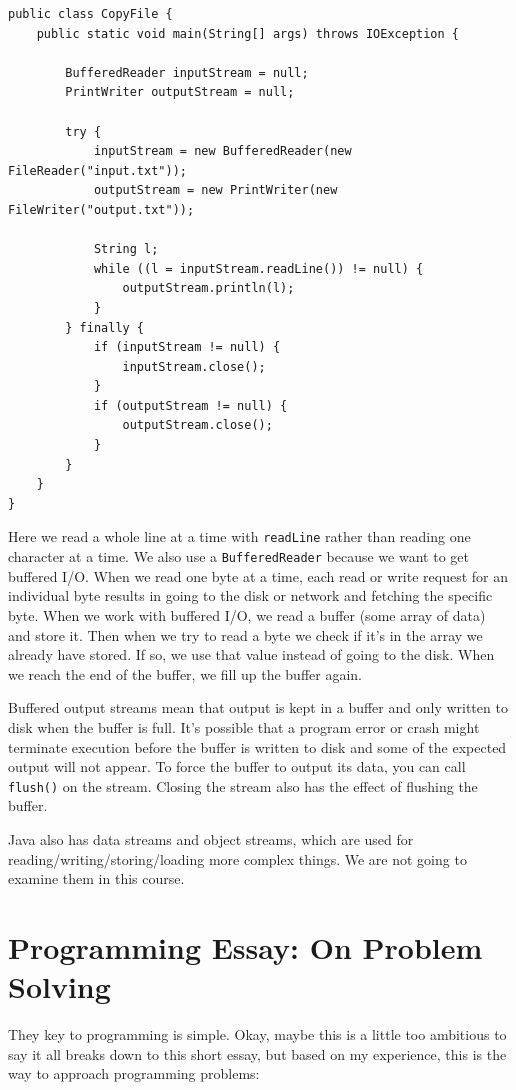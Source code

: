 \begin{verbatim}
public class CopyFile {
    public static void main(String[] args) throws IOException {

        BufferedReader inputStream = null;
        PrintWriter outputStream = null;

        try {
            inputStream = new BufferedReader(new FileReader("input.txt"));
            outputStream = new PrintWriter(new FileWriter("output.txt"));

            String l;
            while ((l = inputStream.readLine()) != null) {
                outputStream.println(l);
            }
        } finally {
            if (inputStream != null) {
                inputStream.close();
            }
            if (outputStream != null) {
                outputStream.close();
            }
        }
    }
}
\end{verbatim}

Here we read a whole line at a time with \texttt{readLine} rather than reading one character at a time. We also use a \texttt{BufferedReader} because we want to get buffered I/O. When we read one byte at a time, each read or write request for an individual byte results in going to the disk or network and fetching the specific byte. When we work with buffered I/O, we read a buffer (some array of data) and store it. Then when we try to read a byte we check if it's in the array we already have stored. If so, we use that value instead of going to the disk. When we reach the end of the buffer, we fill up the buffer again.

Buffered output streams mean that output is kept in a buffer and only written to disk when the buffer is full. It's possible that a program error or crash might terminate execution before the buffer is written to disk and some of the expected output will not appear. To force the buffer to output its data, you can call \texttt{flush()} on the stream. Closing the stream also has the effect of flushing the buffer.

Java also has data streams and object streams, which are used for reading/writing/storing/loading more complex things. We are not going to examine them in this course.


\section*{Programming Essay: On Problem Solving}

They key to programming is simple. Okay, maybe this is a little too ambitious to say it all breaks down to this short essay, but based on my experience, this is the way to approach programming problems:

